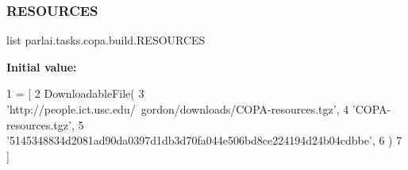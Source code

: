 \subsubsection{\texorpdfstring{R\+E\+S\+O\+U\+R\+C\+ES}{RESOURCES}}
{\footnotesize\ttfamily list parlai.\+tasks.\+copa.\+build.\+R\+E\+S\+O\+U\+R\+C\+ES}

{\bfseries Initial value\+:}
\begin{DoxyCode}
1 =  [
2     DownloadableFile(
3         \textcolor{stringliteral}{'http://people.ict.usc.edu/~gordon/downloads/COPA-resources.tgz'},
4         \textcolor{stringliteral}{'COPA-resources.tgz'},
5         \textcolor{stringliteral}{'5145348834d2081ad90da0397d1db3d70fa044e506bd8ce224194d24b04cdbbe'},
6     )
7 ]
\end{DoxyCode}
